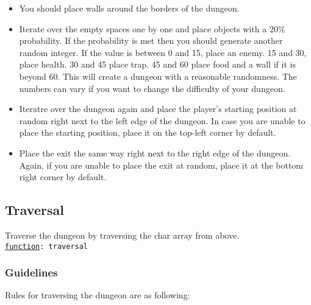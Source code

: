 \documentclass[a4paper,12pt]{article}
\newcommand{\func}[1]{\\{\tt \ul{function}: #1}}
\begin{document}
\begin{itemize}
\item You should place walls around the borders of the dungeon.
\item Iterate over the empty spaces one by one and place objects with a 20\% probability. If the probability is met then you should generate another random integer. If the value is between 0 and 15, place an enemy. 15 and 30, place health. 30 and 45 place trap. 45 and 60 place food and a wall if it is beyond 60. This will create a dungeon with a reasonable randomness. The numbers can vary if you want to change the difficulty of your dungeon.
\item Iteratre over the dungeon again and place the player's starting position at random right next to the left edge of the dungeon. In case you are unable to place the starting position, place it on the top-left corner by default.
\item Place the exit the same way right next to the right edge of the dungeon. Again, if you are unable to place the exit at random, place it at the bottom right corner by default.
\end{itemize}

\subsection{Traversal}
Traverse the dungeon by traversing the char array from above.
\func{traversal}

\subsubsection*{Guidelines}
Rules for traversing the dungeon are as following:
\end{document}
